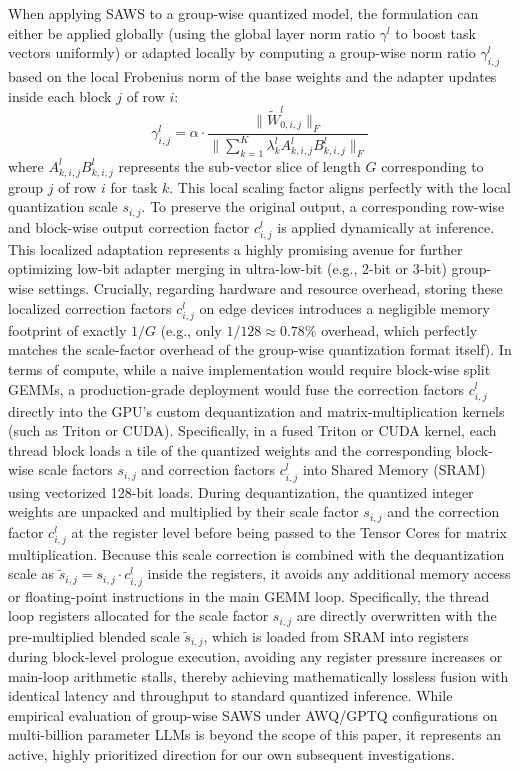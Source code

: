 When applying SAWS to a group-wise quantized model, the formulation can either be applied globally (using the global layer norm ratio $\gamma^l$ to boost task vectors uniformly) or adapted locally by computing a group-wise norm ratio $\gamma^l_{i,j}$ based on the local Frobenius norm of the base weights and the adapter updates inside each block $j$ of row $i$:
\begin{equation}
  \gamma^l_{i,j} = \alpha \cdot \frac{\| \tilde{W}^l_{0, i, j} \|_F}{\| \sum_{k=1}^K \lambda^l_k A^l_{k, i, j} B^l_{k, i, j} \|_F}
\end{equation}
where $A^l_{k, i, j} B^l_{k, i, j}$ represents the sub-vector slice of length $G$ corresponding to group $j$ of row $i$ for task $k$. This local scaling factor aligns perfectly with the local quantization scale $s_{i,j}$. To preserve the original output, a corresponding row-wise and block-wise output correction factor $c^l_{i,j}$ is applied dynamically at inference. This localized adaptation represents a highly promising avenue for further optimizing low-bit adapter merging in ultra-low-bit (e.g., 2-bit or 3-bit) group-wise settings. Crucially, regarding hardware and resource overhead, storing these localized correction factors $c^l_{i,j}$ on edge devices introduces a negligible memory footprint of exactly $1/G$ (e.g., only $1/128 \approx 0.78\%$ overhead, which perfectly matches the scale-factor overhead of the group-wise quantization format itself). In terms of compute, while a naive implementation would require block-wise split GEMMs, a production-grade deployment would fuse the correction factors $c^l_{i,j}$ directly into the GPU's custom dequantization and matrix-multiplication kernels (such as Triton or CUDA). Specifically, in a fused Triton or CUDA kernel, each thread block loads a tile of the quantized weights and the corresponding block-wise scale factors $s_{i,j}$ and correction factors $c^l_{i,j}$ into Shared Memory (SRAM) using vectorized 128-bit loads. During dequantization, the quantized integer weights are unpacked and multiplied by their scale factor $s_{i,j}$ and the correction factor $c^l_{i,j}$ at the register level before being passed to the Tensor Cores for matrix multiplication. Because this scale correction is combined with the dequantization scale as $\tilde{s}_{i,j} = s_{i,j} \cdot c^l_{i,j}$ inside the registers, it avoids any additional memory access or floating-point instructions in the main GEMM loop. Specifically, the thread loop registers allocated for the scale factor $s_{i,j}$ are directly overwritten with the pre-multiplied blended scale $\tilde{s}_{i,j}$, which is loaded from SRAM into registers during block-level prologue execution, avoiding any register pressure increases or main-loop arithmetic stalls, thereby achieving mathematically lossless fusion with identical latency and throughput to standard quantized inference. While empirical evaluation of group-wise SAWS under AWQ/GPTQ configurations on multi-billion parameter LLMs is beyond the scope of this paper, it represents an active, highly prioritized direction for our own subsequent investigations.


